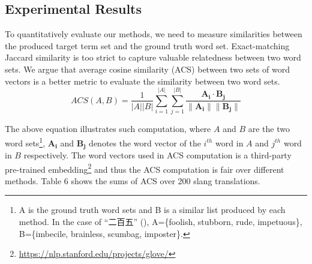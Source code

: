 \subsection{Experimental Results}
\label{sec:exp}

To quantitatively evaluate our methods, we need to measure similarities between 
the produced target term set and the ground truth word set. 
Exact-matching Jaccard similarity is too strict to capture 
valuable relatedness between two word sets.
We argue that average cosine similarity (ACS) between two sets of word 
vectors is a better metric to evaluate the similarity between two word sets.
\begin{equation*}
	ACS (A,B)=
	{\frac{1}{|A||B|}}{\sum_{i=1}^{|A|}{\sum_{j=1}^{|B|}} \frac{\mathbf{A_i }\cdot \mathbf{B_j}}{\|\mathbf{A_i }\|\|\mathbf{B_j }\|}}
\end{equation*}

The above equation illustrates such computation, where $A$ and $B$ are the two word sets\footnote{A is the ground truth word sets and B is a similar list produced by each method. In the case of ``二百五'' (), A=\{foolish, stubborn, rude, impetuous\}, B=\{imbecile, brainless, scumbag, imposter\}.}, $\mathbf{A_i}$ and $\mathbf{B_j}$ denotes the word vector of the $i^{th}$ word in $A$ and $j^{th}$ word in $B$ respectively. 
The word vectors used in ACS computation is a third-party pre-trained 
embedding\footnote{\scriptsize \url{https://nlp.stanford.edu/projects/glove/}} and thus the ACS computation is fair over different methods.
Table 6 shows the sums of ACS over 200 slang translations. 

